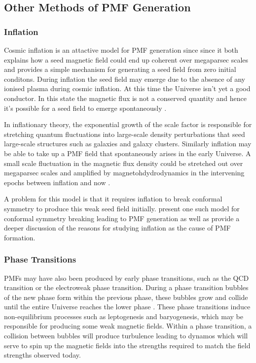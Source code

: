 \subsection{Other Methods of PMF Generation}

\subsubsection{Inflation}
Cosmic inflation is an attactive model for PMF generation since since it both explains how a seed magnetic field could end up coherent over megaparsec scales and provides a simple mechanism for generating a seed field from zero initial conditons. During inflation the seed field may emerge due to the absence of any ionised plasma during cosmic inflation. At this time the Universe isn't yet a good conductor. In this state the magnetic flux is not a conserved quantity and hence it's possible for a seed field to emerge spontaneously \cite{PhysRevD.37.2743}.

In inflationary theory, the exponential growth of the scale factor is responsible for stretching quantum fluctuations into large-scale density perturbations that seed large-scale structures such as galaxies and galaxy clusters. Similarly inflation may be able to take up a PMF field that spontaneously arises in the early Universe. A small scale fluctuation in the magnetic flux density could be stretched out over megaparsec scales and amplified by magnetohdydrodynamics in the intervening epochs between inflation and now \cite{PhysRevD.37.2743}.

A problem for this model is that it requires inflation to break conformal symmetry to produce this weak seed field initially. \cite{PhysRevD.37.2743} present one such model for conformal symmetry breaking leading to PMF generation as well as provide a deeper discussion of the reasons for studying inflation as the cause of PMF formation.
\\
\subsubsection{Phase Transitions}
PMFs may have also been produced by early phase transitions, such as the QCD transition or the electroweak phase transition. During a phase transition bubbles of the new phase form within the previous phase, these bubbles grow and collide until the entire Universe reaches the lower phase \cite{Yamazaki:2012pg}. These phase transitions induce  non-equilibrium processes such as leptogenesis and baryogenesis, which may be responsible for producing some weak magnetic fields. Within a phase transition, a collision between bubbles will produce turbulence leading to dynamos which will serve to spin up the magnetic fields into the strengths required to match the field strengths observed today.

